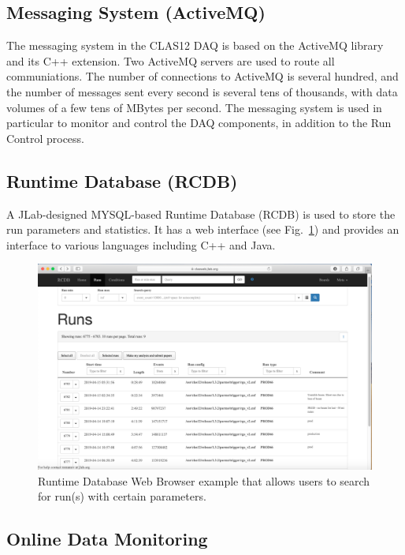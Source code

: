\subsection{Messaging System (ActiveMQ)}

The messaging system in the CLAS12 DAQ is based on the ActiveMQ library and its C++ extension. Two ActiveMQ servers are used to route all communiations. The number of connections to ActiveMQ is several hundred, and the number of messages sent every second is several tens of thousands, with data volumes of a few tens of MBytes per second. The messaging system is used in particular to monitor and control the DAQ components, in addition to the Run Control process.


\subsection{Runtime Database (RCDB)}

A JLab-designed MYSQL-based Runtime Database (RCDB) is used to store the run parameters and statistics. It has a web interface (see Fig.~\ref{fig:rcdb}) and provides an interface to various languages including C++ and Java.

\begin{figure}[hbt]
	\centering
	\includegraphics[width=1.0\columnwidth,keepaspectratio]{img/rcdb.png}
	\caption{Runtime Database Web Browser example that allows users to search for run(s) with certain parameters.}
	\label{fig:rcdb}
\end{figure}

\subsection{Online Data Monitoring}

